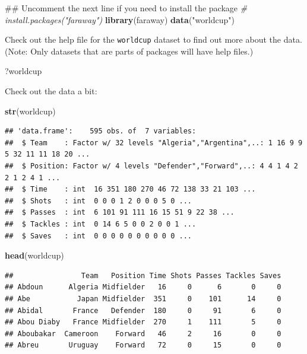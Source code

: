 \documentclass[]{book}
\makeatletter
\newenvironment{Shaded}{\begin{snugshade}}{\end{snugshade}}
\newcommand{\KeywordTok}[1]{\textcolor[rgb]{0.13,0.29,0.53}{\textbf{#1}}}
\newcommand{\StringTok}[1]{\textcolor[rgb]{0.31,0.60,0.02}{#1}}
\newcommand{\CommentTok}[1]{\textcolor[rgb]{0.56,0.35,0.01}{\textit{#1}}}
\newcommand{\NormalTok}[1]{#1}
\newenvironment{kframe}{%
\medskip{}
\setlength{\fboxsep}{.8em}
 \def\at@end@of@kframe{}%
 \ifinner\ifhmode%
  \def\at@end@of@kframe{\end{minipage}}%
  \begin{minipage}{\columnwidth}%
 \fi\fi%
 \def\FrameCommand##1{\hskip\@totalleftmargin \hskip-\fboxsep
 \colorbox{shadecolor}{##1}\hskip-\fboxsep
     \hskip-\linewidth \hskip-\@totalleftmargin \hskip\columnwidth}%
 \MakeFramed {\advance\hsize-\width
   \@totalleftmargin\z@ \linewidth\hsize
   \@setminipage}}%
 {\par\unskip\endMakeFramed%
 \at@end@of@kframe}
\renewenvironment{Shaded}{\begin{kframe}}{\end{kframe}}
\theoremstyle{definition}
\theoremstyle{definition}
\theoremstyle{definition}
\theoremstyle{remark}
\makeatother
\begin{document}
\begin{Shaded}
\begin{Highlighting}[]
\NormalTok{## Uncomment the next line if you need to install the package}
\CommentTok{# install.packages("faraway")}
\KeywordTok{library}\NormalTok{(faraway)}
\KeywordTok{data}\NormalTok{(}\StringTok{"worldcup"}\NormalTok{)}
\end{Highlighting}
\end{Shaded}

Check out the help file for the \texttt{worldcup} dataset to find out
more about the data. (Note: Only datasets that are parts of packages
will have help files.)

\begin{Shaded}
\begin{Highlighting}[]
\NormalTok{?worldcup}
\end{Highlighting}
\end{Shaded}

Check out the data a bit:

\begin{Shaded}
\begin{Highlighting}[]
\KeywordTok{str}\NormalTok{(worldcup)}
\end{Highlighting}
\end{Shaded}

\begin{verbatim}
## 'data.frame':    595 obs. of  7 variables:
##  $ Team    : Factor w/ 32 levels "Algeria","Argentina",..: 1 16 9 9 5 32 11 11 18 20 ...
##  $ Position: Factor w/ 4 levels "Defender","Forward",..: 4 4 1 4 2 2 1 2 4 1 ...
##  $ Time    : int  16 351 180 270 46 72 138 33 21 103 ...
##  $ Shots   : int  0 0 0 1 2 0 0 0 5 0 ...
##  $ Passes  : int  6 101 91 111 16 15 51 9 22 38 ...
##  $ Tackles : int  0 14 6 5 0 0 2 0 0 1 ...
##  $ Saves   : int  0 0 0 0 0 0 0 0 0 0 ...
\end{verbatim}

\begin{Shaded}
\begin{Highlighting}[]
\KeywordTok{head}\NormalTok{(worldcup)}
\end{Highlighting}
\end{Shaded}

\begin{verbatim}
##                Team   Position Time Shots Passes Tackles Saves
## Abdoun      Algeria Midfielder   16     0      6       0     0
## Abe           Japan Midfielder  351     0    101      14     0
## Abidal       France   Defender  180     0     91       6     0
## Abou Diaby   France Midfielder  270     1    111       5     0
## Aboubakar  Cameroon    Forward   46     2     16       0     0
## Abreu       Uruguay    Forward   72     0     15       0     0
\end{verbatim}
\end{document}
